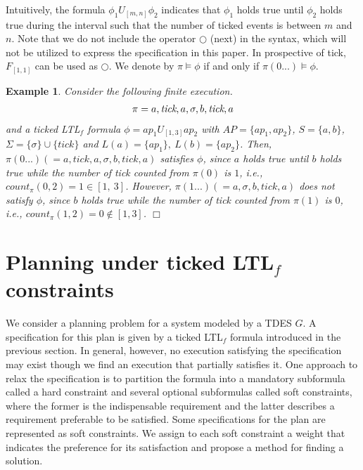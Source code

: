 \documentclass[journal,twoside,web]{IEEEtran}
\newcommand{\qedwhite}{\hfill \ensuremath{\Box}}
\newtheorem{exa}{Example}
\begin{document}
Intuitively, the formula $\phi_1 U_{[m,n]}  \phi_2$ indicates that $\phi_1$ holds true until $\phi_2$ holds true during the interval such that the number of ticked events is between $m$ and $n$. 
Note that we do not include the operator $\bigcirc$ (next) in the syntax, which will not be utilized to express the specification in this paper. In prospective of tick, $F_{[1,1]}$ can be used as $\bigcirc$. 
We denote by $\pi \models \phi$ if and only if $\pi (0...) \models \phi$.

\begin{exa}
Consider the following finite execution.
\begin{align}
\pi=a,\textit{tick},a,\sigma,b,\textit{tick},a \notag
\end{align}
and a ticked LTL$_f$ formula $\phi=ap_1 U_{[1,3]} ap_2$ with $AP=\{ap_1,ap_2\}$, $S=\{a,b\}$, $\Sigma=\{\sigma\}\cup\{\textit{tick}\}$ and $L(a)=\{ap_1\},\ L(b)=\{ap_2\}$. Then, $\pi(0...) (= a,\textit{tick},a,\sigma,b,\textit{tick},a)$ satisfies $\phi$, since $a$ holds true until $b$ holds true while the number of \textit{tick} counted from $\pi(0)$ is $1$, i.e., $count_{\pi}(0, 2) = 1 \in[ 1,\ 3]$. However, $\pi (1...) (= a,\sigma,b,\textit{tick},a)$ does \textit{not} satisfy $\phi$, since $b$ holds true while the number of \textit{tick} counted from $\pi(1)$ is $0$, i.e., $count_{\pi}(1, 2) = 0 \notin [1, 3]$. \qedwhite 
\end{exa}

%
%
\section{Planning under ticked LTL$_f$ constraints}\label{sec4}
%
We consider a planning problem for a system modeled by a TDES $G$.
A specification for this plan is given by a ticked LTL$_f$ formula introduced in the previous section. 
In general, however, no execution satisfying the specification may exist though we find an execution that partially satisfies it. 
One approach to relax the specification is to partition the formula into a mandatory subformula called a hard constraint and several optional subformulas called soft constraints, where the former is the indispensable requirement and the latter describes a requirement preferable to be satisfied.  
Some specifications for the plan are represented as soft constraints.  
We assign to each soft constraint a weight that indicates the preference for its satisfaction and propose a method for finding a solution.
\end{document}
